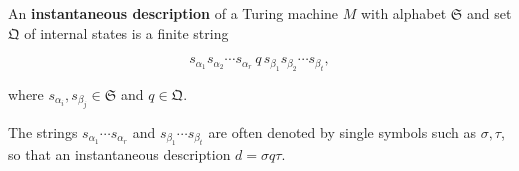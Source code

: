 An \textbf{instantaneous description} of a Turing machine $M$ with alphabet $\mathfrak{S}$ and set $\mathfrak{Q}$ of internal states is a finite string

$$s_{\alpha_1} s_{\alpha_2} \cdots s_{\alpha_r} \, q \, s_{\beta_1} s_{\beta_2} \cdots s_{\beta_t},$$

where $s_{\alpha_i}, s_{\beta_j} \in \mathfrak{S}$ and $q \in \mathfrak{Q}$.

The strings $s_{\alpha_1} \cdots s_{\alpha_r}$ and $s_{\beta_1} \cdots s_{\beta_t}$ are often denoted by single symbols such as $\sigma, \tau$, so that an instantaneous description $d = \sigma q \tau$.
